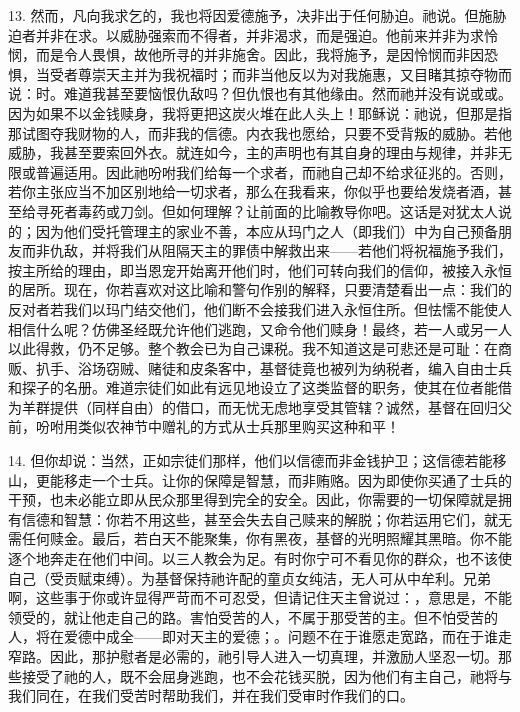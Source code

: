 13. 然而，凡向我求乞的，我也将因爱德施予，决非出于任何胁迫。祂说。但施胁迫者并非在求。以威胁强索而不得者，并非渴求，而是强迫。他前来并非为求怜悯，而是令人畏惧，故他所寻的并非施舍。因此，我将施予，是因怜悯而非因恐惧，当受者尊崇天主并为我祝福时；而非当他反以为对我施惠，又目睹其掠夺物而说：时。难道我甚至要恼恨仇敌吗？但仇恨也有其他缘由。然而祂并没有说或或。因为如果不以金钱赎身，我将更把这炭火堆在此人头上！耶稣说：祂说，但那是指那试图夺我财物的人，而非我的信德。内衣我也愿给，只要不受背叛的威胁。若他威胁，我甚至要索回外衣。就连如今，主的声明也有其自身的理由与规律，并非无限或普遍适用。因此祂吩咐我们给每一个求者，而祂自己却不给求征兆的。否则，若你主张应当不加区别地给一切求者，那么在我看来，你似乎也要给发烧者酒，甚至给寻死者毒药或刀剑。但如何理解？让前面的比喻教导你吧。这话是对犹太人说的；因为他们受托管理主的家业不善，本应从玛门之人（即我们）中为自己预备朋友而非仇敌，并将我们从阻隔天主的罪债中解救出来——若他们将祝福施予我们，按主所给的理由，即当恩宠开始离开他们时，他们可转向我们的信仰，被接入永恒的居所。现在，你若喜欢对这比喻和警句作别的解释，只要清楚看出一点：我们的反对者若我们以玛门结交他们，他们断不会接我们进入永恒住所。但怯懦不能使人相信什么呢？仿佛圣经既允许他们逃跑，又命令他们赎身！最终，若一人或另一人以此得救，仍不足够。整个教会已为自己课税。我不知道这是可悲还是可耻：在商贩、扒手、浴场窃贼、赌徒和皮条客中，基督徒竟也被列为纳税者，编入自由士兵和探子的名册。难道宗徒们如此有远见地设立了这类监督的职务，使其在位者能借为羊群提供（同样自由）的借口，而无忧无虑地享受其管辖？诚然，基督在回归父前，吩咐用类似农神节中赠礼的方式从士兵那里购买这种和平！\par

14. 但你却说：当然，正如宗徒们那样，他们以信德而非金钱护卫；这信德若能移山，更能移走一个士兵。让你的保障是智慧，而非贿赂。因为即使你买通了士兵的干预，也未必能立即从民众那里得到完全的安全。因此，你需要的一切保障就是拥有信德和智慧：你若不用这些，甚至会失去自己赎来的解脱；你若运用它们，就无需任何赎金。最后，若白天不能聚集，你有黑夜，基督的光明照耀其黑暗。你不能逐个地奔走在他们中间。以三人教会为足。有时你宁可不看见你的群众，也不该使自己（受贡赋束缚）。为基督保持祂许配的童贞女纯洁，无人可从中牟利。兄弟啊，这些事于你或许显得严苛而不可忍受，但请记住天主曾说过：，意思是，不能领受的，就让他走自己的路。害怕受苦的人，不属于那受苦的主。但不怕受苦的人，将在爱德中成全——即对天主的爱德；。问题不在于谁愿走宽路，而在于谁走窄路。因此，那护慰者是必需的，祂引导人进入一切真理，并激励人坚忍一切。那些接受了祂的人，既不会屈身逃跑，也不会花钱买脱，因为他们有主自己，祂将与我们同在，在我们受苦时帮助我们，并在我们受审时作我们的口。\par

